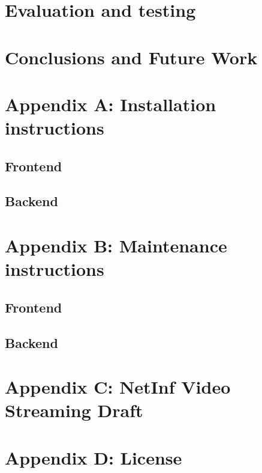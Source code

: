 \documentclass[11pt]{report}
\begin{document}






\chapter{Evaluation and testing}
\label{sec:evaluation}



\chapter{Conclusions and Future Work}
\label{sec:conclusions}



\chapter{Appendix A: Installation instructions}
\section {Frontend}

\section {Backend}

\chapter {Appendix B: Maintenance instructions}

\section{Frontend}
\label{sec:Frontend Installation Instructions}

\section{Backend}

\chapter {Appendix C: NetInf Video Streaming Draft}

\chapter {Appendix D: License}



\end{document}
